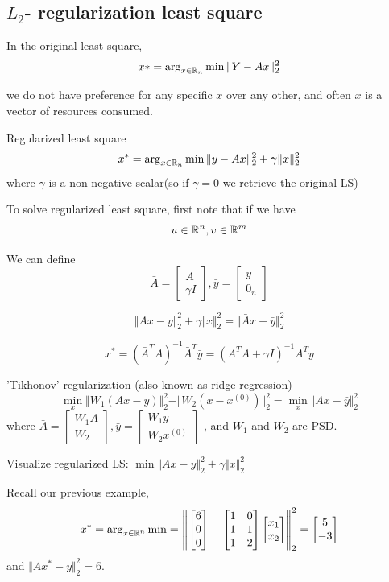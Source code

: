 \subsection{$L_2$- regularization least square}


In the original least square, 
$$x*=\arg_{x\in\mathbb{R}_{n}} \min \Vert Y-Ax\Vert ^2_2$$

we do not have preference for any specific $x$ over any other, and often $x$ is a vector of resources consumed.


Regularized least square
$$x^*=\arg_{x\in\mathbb{R}_{n}} \min \Vert y-Ax\Vert ^2_2 + \gamma \Vert x\Vert ^2_2$$
where $\gamma$ is a non negative scalar(so if $\gamma = 0$ we retrieve the original LS)


To solve regularized least square, first note that if we have
$$u\in\mathbb{R}^{n}, v\in\mathbb{R}^{m}$$

We can define 
$$
\bar{A}=
\begin{bmatrix}
A\\
\gamma I
\end{bmatrix}
,
\bar{y}=
\begin{bmatrix}
y\\
0_n
\end{bmatrix}
$$


$$\Vert Ax - y\Vert ^2_2 + \gamma \Vert x\Vert ^2_2=\Vert \bar{A}x-\bar{y}\Vert^2_2$$

$$x^*=(\bar{A}^T A)^{-1} \bar{A}^T \bar{y}=(A^T A+\gamma I)^{-1} A^T y$$


\vspace{0.5cm}
'Tikhonov' regularization (also known as ridge regression)
$$\min_x \Vert W_1 (Ax - y)\Vert^2_2 - \Vert W_2 (x - x^{(0)})\Vert^2_2 = \min_x \Vert \bar{A}x-\bar{y}\Vert^2_2 $$
where $\bar{A} = 
\begin{bmatrix}
W_1 A\\
W_2
\end{bmatrix}
,
\bar{y} = 
\begin{bmatrix}
	W_1 y\\
	W_2 x^{(0)}
\end{bmatrix}
$
, and $W_1$ and $W_2$ are PSD.


\vspace{0.8cm}
Visualize regularized LS: $\min \Vert Ax-y\Vert_2^2 +\gamma \Vert x\Vert^2_2$

Recall our previous example, 
$$x^*= \arg_{x\in \mathbb{R}^n} \min =
\left\Vert
\begin{bmatrix}
6\\
0\\
0
\end{bmatrix}
-
\begin{bmatrix}
1&0\\
1&1\\
1&2
\end{bmatrix}
\begin{bmatrix}
x_1\\
x_2
\end{bmatrix}
\right\Vert^2_2
=
\begin{bmatrix}
5\\
-3
\end{bmatrix}
$$
and $\Vert Ax^*-y\Vert_2^2 = 6$.


